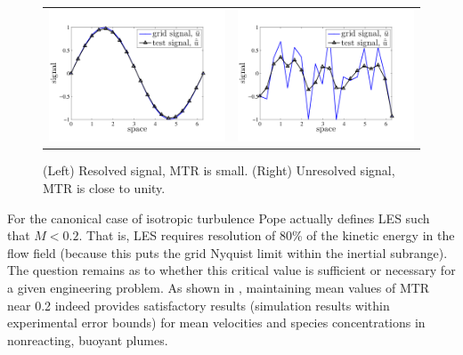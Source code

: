\documentclass[11pt]{book}
\begin{document}
\begin{figure}[ht]
\centering
\begin{tabular}{rl}
\includegraphics[width=0.4\linewidth]{FIGURES/mtr_resolved_signal} &
\includegraphics[width=0.4\linewidth]{FIGURES/mtr_unresolved_signal}
\end{tabular}
\vskip-0.2cm
\caption[Examples of the measure of turbulence resolution]{(Left) Resolved signal, MTR is small. (Right) Unresolved signal, MTR is close to unity.}
\label{fig_mtr}
\end{figure}

For the canonical case of isotropic turbulence Pope actually defines LES such that $M<0.2$.  That is, LES requires resolution of 80\% of the kinetic energy in the flow field (because this puts the grid Nyquist limit within the inertial subrange).  The question remains as to whether this critical value is sufficient or necessary for a given engineering problem.  As shown in \cite{McDermott:2010}, maintaining mean values of MTR near 0.2 indeed provides satisfactory results (simulation results within experimental error bounds) for mean velocities and species concentrations in nonreacting, buoyant plumes.
\end{document}
